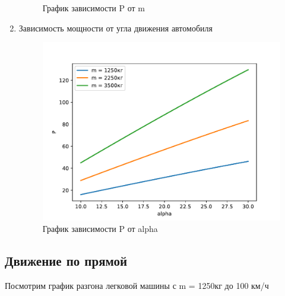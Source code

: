 \documentclass[a4paper, 14pt]{extarticle}
\begin{document}
\begin{enumerate}
\begin{figure}[H]
						\caption[.] {График зависимости P от m}
					\end{figure}
				\pagebreak
				\item Зависимость мощности от угла движения автомобиля
				\begin{figure}[H]
					\centering
					\includegraphics[width = \linewidth]{fig4.pdf}
					\caption[.] {График зависимости P от alpha}
				\end{figure}
			\end{enumerate}
		\pagebreak
		\subsection{Движение по прямой}
			Посмотрим график разгона легковой машины с m = 1250кг до 100 км/ч 
			
\end{document}
